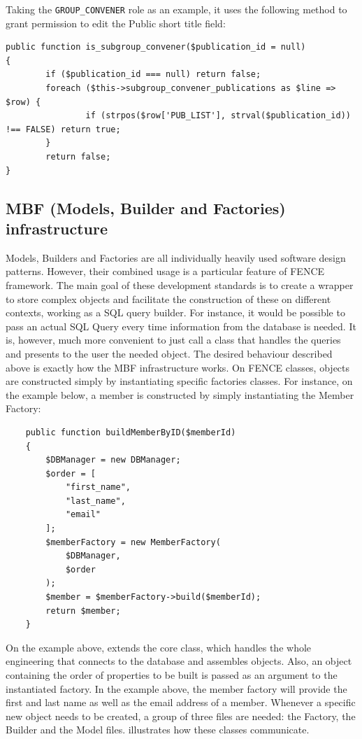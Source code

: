 Taking the \texttt{GROUP\_CONVENER} role as an example, it uses the following method to grant permission to edit the Public short title field:

\begin{lstlisting}
public function is_subgroup_convener($publication_id = null)
{
        if ($publication_id === null) return false;
        foreach ($this->subgroup_convener_publications as $line => $row) {
                if (strpos($row['PUB_LIST'], strval($publication_id)) !== FALSE) return true;
        }
        return false;
}
\end{lstlisting}


\subsection{MBF (Models, Builder and Factories) infrastructure}%
\label{sec:MBF_Models_Builder_and_Factories_infrastructure}

Models, Builders and Factories are all individually heavily used software design patterns.
However, their combined usage is a particular feature of FENCE framework.
The main goal of these development standards is to create a wrapper to store complex objects and facilitate the construction of these on different contexts, working as a SQL query builder.
For instance, it would be possible to pass an actual SQL Query every time information from the database is needed.
It is, however, much more convenient to just call a class that handles the queries and presents to the user the needed object.
The desired behaviour described above is exactly how the MBF infrastructure works.
On FENCE classes, objects are constructed simply by instantiating specific factories classes.
For instance, on the example below, a member is constructed by simply instantiating the Member Factory:

\begin{lstlisting}
    public function buildMemberByID($memberId)
    {
        $DBManager = new DBManager;
        $order = [
            "first_name",
            "last_name",
            "email"
        ];
        $memberFactory = new MemberFactory(
            $DBManager,
            $order
        );
        $member = $memberFactory->build($memberId);
        return $member;
    }
\end{lstlisting}

On the example above,  extends the core  class, which handles the whole engineering that connects to the database and assembles objects. Also, an object containing the order of properties to be built is passed as an argument to the instantiated factory. In the example above, the member factory will provide the first and last name as well as the email address of a member.
Whenever a specific new object needs to be created, a group of three files are needed:
the Factory, the Builder and the Model files.  illustrates how these classes communicate.

